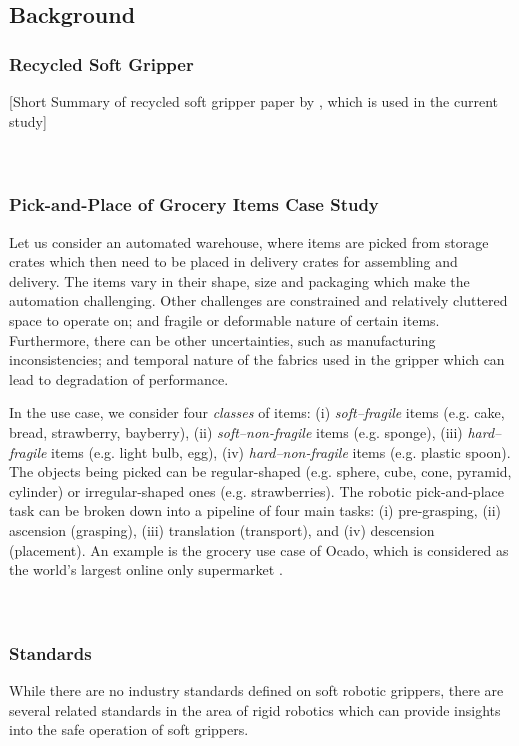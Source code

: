 \documentclass[lettersize,journal]{IEEEtran}
\begin{document}
\subsection{Background}\label{background}
\subsubsection{Recycled Soft Gripper}

[Short Summary of recycled soft gripper paper by \cite{Partridge2022}, which is used in the current study]
\\\\\\
\subsubsection{Pick-and-Place of Grocery Items Case Study}
Let us consider an automated warehouse, where items are picked from storage crates which then need to be placed in delivery crates for assembling and delivery. 
The items vary in their shape, size and packaging which make the automation challenging. 
Other challenges are constrained and relatively cluttered space to operate on; and fragile or deformable nature of certain items. 
Furthermore, there can be other uncertainties, such as manufacturing inconsistencies; and temporal nature of the fabrics used in the gripper which can lead to degradation of performance. 

In the use case, we consider four \emph{classes} of items: (i) \emph{soft–fragile} items (e.g. cake, bread, strawberry, bayberry), (ii) \emph{soft–non-fragile} items (e.g. sponge), (iii) \emph{hard–fragile} items (e.g. light bulb, egg), (iv) \emph{hard–non-fragile} items (e.g. plastic spoon). 
The objects being picked can be regular-shaped (e.g. sphere, cube, cone, pyramid, cylinder) or irregular-shaped ones (e.g. strawberries).
The robotic pick-and-place task can be broken down into a pipeline of four main tasks: (i) pre-grasping, (ii) ascension (grasping), (iii) translation (transport), and (iv) descension (placement). 
An example is the grocery use case of Ocado, which is considered as the world's largest online only supermarket \cite{Triantafyllou2019, Sotiropoulos2018}. \\\\\\

\subsubsection{Standards}
While there are no industry standards defined on soft robotic grippers, there are several related standards in the area of rigid robotics which can provide insights into the safe operation of soft grippers. 
\end{document}
